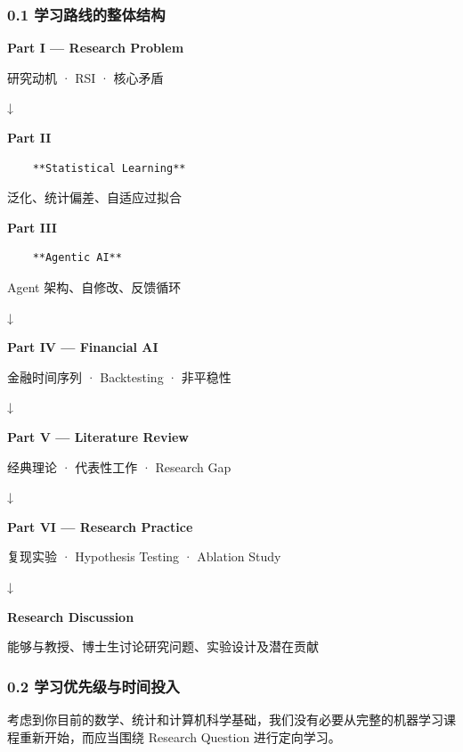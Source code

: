 \hypertarget{part-1-03-0001-ux5b66ux4e60ux8defux7ebfux7684ux6574ux4f53ux7ed3ux6784}{%
\subsubsection{0.1 学习路线的整体结构}\label{part-1-03-0001-ux5b66ux4e60ux8defux7ebfux7684ux6574ux4f53ux7ed3ux6784}}

\textbf{Part I --- Research Problem}

研究动机 · RSI · 核心矛盾

↓

\textbf{Part II}

\begin{verbatim}
    **Statistical Learning**
\end{verbatim}

泛化、统计偏差、自适应过拟合

\textbf{Part III}

\begin{verbatim}
    **Agentic AI**
\end{verbatim}

Agent 架构、自修改、反馈循环

↓

\textbf{Part IV --- Financial AI}

金融时间序列 · Backtesting · 非平稳性

↓

\textbf{Part V --- Literature Review}

经典理论 · 代表性工作 · Research Gap

↓

\textbf{Part VI --- Research Practice}

复现实验 · Hypothesis Testing · Ablation Study

↓

\textbf{Research Discussion}

能够与教授、博士生讨论研究问题、实验设计及潜在贡献

\hypertarget{part-1-03-0001-ux5b66ux4e60ux4f18ux5148ux7ea7ux4e0eux65f6ux95f4ux6295ux5165}{%
\subsubsection{0.2 学习优先级与时间投入}\label{part-1-03-0001-ux5b66ux4e60ux4f18ux5148ux7ea7ux4e0eux65f6ux95f4ux6295ux5165}}

考虑到你目前的数学、统计和计算机科学基础，我们没有必要从完整的机器学习课程重新开始，而应当围绕 Research Question 进行定向学习。

